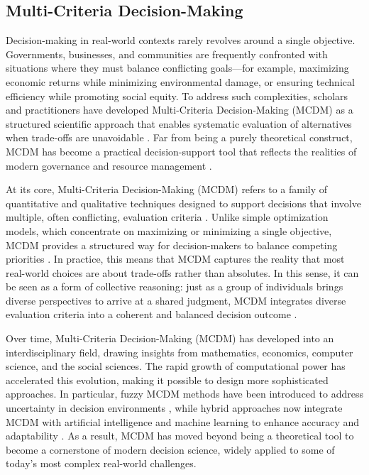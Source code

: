\subsection{Multi-Criteria Decision-Making}
Decision-making in real-world contexts rarely revolves around a single objective. Governments, businesses, and communities are frequently confronted with situations where they must balance conflicting goals—for example, maximizing economic returns while minimizing environmental damage, or ensuring technical efficiency while promoting social equity. To address such complexities, scholars and practitioners have developed Multi-Criteria Decision-Making (MCDM) as a structured scientific approach that enables systematic evaluation of alternatives when trade-offs are unavoidable \cite{Aruldoss2013,Taherdoost2023}. Far from being a purely theoretical construct, MCDM has become a practical decision-support tool that reflects the realities of modern governance and resource management \cite{HUANG2011}.

At its core, Multi-Criteria Decision-Making (MCDM) refers to a family of quantitative and qualitative techniques designed to support decisions that involve multiple, often conflicting, evaluation criteria \cite{Aruldoss2013,Taherdoost2023}. Unlike simple optimization models, which concentrate on maximizing or minimizing a single objective, MCDM provides a structured way for decision-makers to balance competing priorities \cite{KUMAR2017596,jones2010}. In practice, this means that MCDM captures the reality that most real-world choices are about trade-offs rather than absolutes. In this sense, it can be seen as a form of collective reasoning: just as a group of individuals brings diverse perspectives to arrive at a shared judgment, MCDM integrates diverse evaluation criteria into a coherent and balanced decision outcome \cite{Borges2020,Cinalli2015}.

Over time, Multi-Criteria Decision-Making (MCDM) has developed into an interdisciplinary field, drawing insights from mathematics, economics, computer science, and the social sciences. The rapid growth of computational power has accelerated this evolution, making it possible to design more sophisticated approaches. In particular, fuzzy MCDM methods have been introduced to address uncertainty in decision environments \cite{LIANG1999,Mardani2015}, while hybrid approaches now integrate MCDM with artificial intelligence and machine learning to enhance accuracy and adaptability \cite{karakus2022}. As a result, MCDM has moved beyond being a theoretical tool to become a cornerstone of modern decision science, widely applied to some of today’s most complex real-world challenges.

